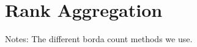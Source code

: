 \section{Rank Aggregation}\label{sec:rank_aggregation}
Notes:
The different borda count methods we use.